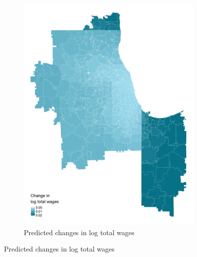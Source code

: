 \documentclass[aspectratio=169, t]{beamer}
\begin{document}
\begin{frame}
\begin{figure}
\begin{subfigure}{0.51\textwidth}
                         \includegraphics[width = 0.99\textwidth]{counterfactuals/output/chicago_d_ln_wagebill.png}
            \caption*{Predicted changes in log total wages}
        \end{subfigure}
    \end{figure}    
\end{frame}
\end{document}
